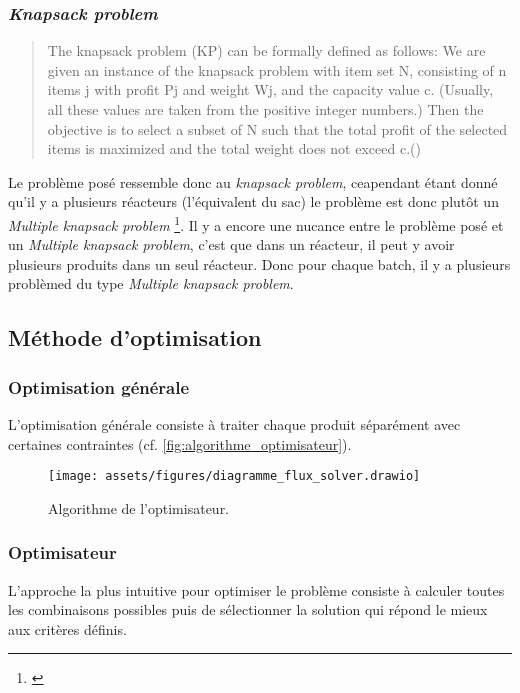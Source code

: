 \subsubsection{\textit{Knapsack problem}}
\begin{quotation}
    \og The knapsack problem (KP) can be formally defined as follows: We are given an
    instance of the knapsack problem with item set N, consisting of n items j with profit
    Pj and weight Wj, and the capacity value c. (Usually, all these values are taken from
    the positive integer numbers.) Then the objective is to select a subset of N such
    that the total profit of the selected items is maximized and the total weight does not
    exceed c.\fg (\cite[p. 2]{KnapsackProblemsBook})
\end{quotation}
Le problème posé ressemble donc au \textit{knapsack problem}, ceapendant étant donné qu'il y a plusieurs réacteurs (l'équivalent du sac) le problème est donc plutôt un \textit{Multiple knapsack problem} \footnote{\parencite[p. 285]{KnapsackProblemsBook}}. Il y a encore une nucance entre le problème posé et un \textit{Multiple knapsack problem}, c'est que dans un réacteur, il peut y avoir plusieurs produits dans un seul réacteur. Donc pour chaque batch, il y a plusieurs problèmed du type \textit{Multiple knapsack problem}.
\subsection{Méthode d'optimisation}
\subsubsection{Optimisation générale}
L'optimisation générale consiste à traiter chaque produit séparément avec certaines contraintes (cf. \autoref{fig:algorithme_optimisateur}).
\begin{figure}[H]
    \centering
    \texttt{[image: assets/figures/diagramme\_flux\_solver.drawio]}
    \caption{Algorithme de l'optimisateur.}
    \label{fig:algorithme_optimisateur}
\end{figure}

\subsubsection{Optimisateur}
L'approche la plus intuitive pour optimiser le problème consiste à calculer toutes les combinaisons possibles puis de sélectionner la solution qui répond le mieux aux critères définis.

